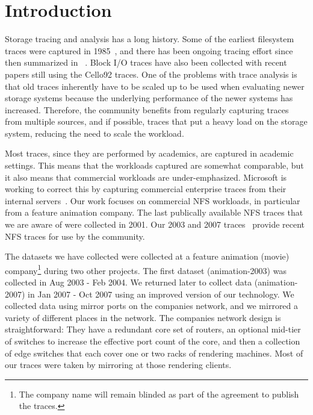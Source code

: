 \section{Introduction}



Storage tracing and analysis has a long history.  Some of the earliest
filesystem traces were captured in 1985~\cite{ousterhout85}, and there
has been ongoing tracing effort since then summarized in
~\cite{LeungUsenix08}.  Block I/O traces have also been collected with
recent papers still using the Cello92 traces.  One of the problems
with trace analysis is that old traces inherently have to be scaled up
to be used when evaluating newer storage systems because the
underlying performance of the newer systems has increased.  Therefore,
the community benefits from regularly capturing traces from multiple
sources, and if possible, traces that put a heavy load on the storage
system, reducing the need to scale the workload.

Most traces, since they are performed by academics, are captured in
academic settings.  This means that the workloads captured are
somewhat comparable, but it also means that commercial workloads are
under-emphasized.  Microsoft is working to correct this by capturing
commercial enterprise traces from their internal
servers~\cite{snia-iotta-microsoft}.  Our work focuses on commercial
NFS workloads, in particular from a feature animation company.  The
last publically available NFS traces that we are aware of were
collected in 2001.  Our 2003 and 2007
traces~\cite{animation-bear-traces} provide recent NFS traces for use
by the community.

The datasets we have collected were collected at a feature animation
(movie) company\footnote{The company name will remain blinded as part
of the agreement to publish the traces.} during two other projects.
The first dataset (animation-2003) was collected in Aug 2003 - Feb 2004.  We
returned later to collect data (animation-2007) in Jan 2007 - Oct 2007 using an
improved version of our technology.  We collected data using mirror
ports on the companies network, and we mirrored a variety of different
places in the network.  The companies network design is
straightforward: They have a redundant core set of routers, an
optional mid-tier of switches to increase the effective port count of
the core, and then a collection of edge switches that each cover one
or two racks of rendering machines.  Most of our traces were taken by
mirroring at those rendering clients.

